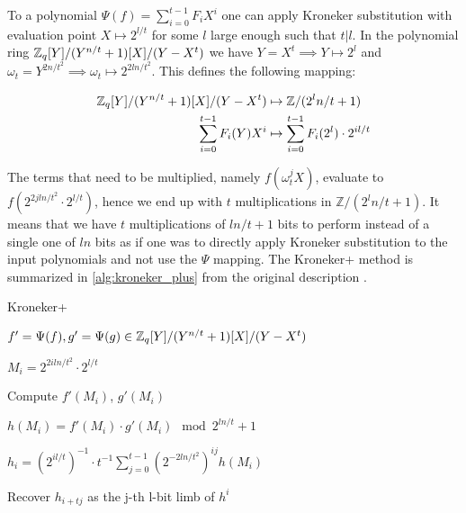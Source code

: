 To a polynomial $\Psi(f) = \sum_{i=0}^{t-1} F_i X^i$ one can apply Kroneker substitution with evaluation point $X \mapsto 2^{l/t}$ for some $l$ large enough such that $t|l$. In the polynomial ring $\mathbb{Z}_q[Y]/(Y^{n/t} + 1)[X]/(Y-X^t)$ we have $Y = X^t \implies Y \mapsto 2^l$ and $\omega_t = Y^{2n/t^2} \implies \omega_t \mapsto 2^{2ln/t^2}$. This defines the following mapping:

\begin{align*}
    \mathbb{Z}_q[Y]/(Y^{n/t} + 1)[X]/(Y-X^t) &\mapsto \mathbb{Z} / (2^ln/t + 1) \\
    \sum_{i=0}^{t-1} F_i(Y) X^i &\mapsto \sum_{i=0}^{t-1} F_i(2^l) \cdot 2^{il/t}
\end{align*}

The terms that need to be multiplied, namely $f(\omega_t^j X)$, evaluate to $f(2^{2jln/t^2} \cdot 2^{l/t})$, hence we end up with $t$ multiplications in $\mathbb{Z} / (2^ln/t + 1)$. It means that we have $t$ multiplications of $ln/t + 1$ bits to perform instead of a single one of $ln$ bits as if one was to directly apply Kroneker substitution to the input polynomials and not use the $\Psi$ mapping. The Kroneker+ method is summarized in \cref{alg:kroneker_plus} from the original description \parencite{cryptoeprint:2020/1303}. 

\begin{algorithm}
    \caption{Kroneker+}
    \label{alg:kroneker_plus}
    \begin{algorithmic}[1]
    
  
        \State $f' = \Psi(f), g'= \Psi(g) \in \mathbb{Z}_q[Y]/(Y^{n/t} + 1)[X]/(Y-X^t)$
  
        \State $M_i = 2^{2iln/t^2} \cdot 2^{l/t}$ 
  
        \State Compute $f'(M_i)$, $g'(M_i)$ 
  
        \State $h(M_i) = f'(M_i) \cdot g'(M_i) \mod 2^{ln/t} + 1$ 
  
        \State $h_i = (2^{il/t})^{-1} \cdot t^{-1} \sum_{j=0}^{t-1} (2^{-2ln/t^2})^{ij} h(M_i)$ 
    
        \State Recover $h_{i + tj}$ as the j-th l-bit limb of $h^i$ 
  
    \EndProcedure
    
    \end{algorithmic}
  \end{algorithm}

